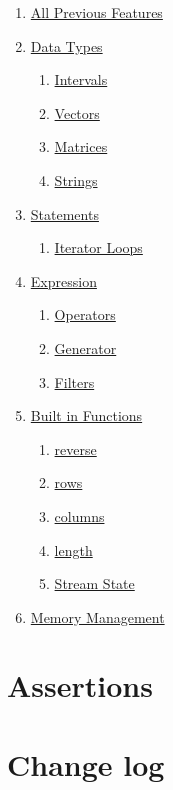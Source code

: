 \documentclass{article}
\begin{document}
	\begin{enumerate}[label*=\arabic*]
		\item \hyperref[sec:part1]{All Previous Features}
		\item \hyperref[sec:types]{Data Types}
		\begin{enumerate}[label*=.\arabic*]
			\item \hyperref[sec:interval]{Intervals}
			\item \hyperref[sec:vector]{Vectors}
			\item \hyperref[sec:matrix]{Matrices}
			\item \hyperref[sec:string]{Strings}
		\end{enumerate}
		\item \hyperref[sec:statements]{Statements}
		\begin{enumerate}[label*=.\arabic*]
			\item \hyperref[sec:iteratorLoop]{Iterator Loops}
		\end{enumerate}
		\item \hyperref[sec:expressions]{Expression}
		\begin{enumerate}[label*=.\arabic*]
			\item \hyperref[sec:operators]{Operators}
			\item \hyperref[sec:generators]{Generator}
			\item \hyperref[sec:filters]{Filters}
		\end{enumerate}
		\item \hyperref[sec:builtIn]{Built in Functions}
		\begin{enumerate}[label*=.\arabic*]
			\item \hyperref[sec:reverse]{reverse}
			\item \hyperref[sec:rowsColumns]{rows}
			\item \hyperref[sec:rowsColumns]{columns}
			\item \hyperref[sec:length]{length}
			\item \hyperref[sec:streamState]{Stream State}
		\end{enumerate}
		\item \hyperref[sec:memory]{Memory Management}
	\end{enumerate}

\section{Assertions}
\label{sec:assertions}


\section{Change log}
\label{sec:changelog}

\end{document}
